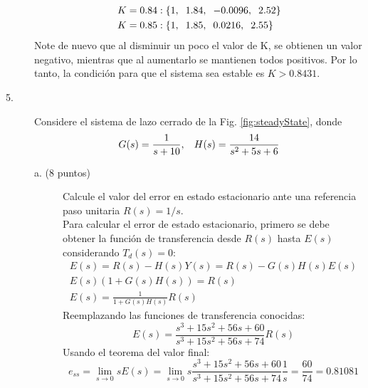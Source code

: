 \documentclass[11pt, spanish]{article}
\begin{document}
\begin{description}
			\begin{align*}
				K &= 0.84: \{1,\hspace*{2mm} 1.84,\hspace*{2mm} -0.0096,\hspace*{2mm} 2.52\}\\
				K &= 0.85: \{1,\hspace*{2mm} 1.85,\hspace*{2mm} 0.0216,\hspace*{2mm} 2.55\}
			\end{align*}
			Note de nuevo que al disminuir un poco el valor de K, se obtienen un valor negativo, mientras que al aumentarlo se mantienen todos positivos. Por lo tanto, la condición para que el sistema sea estable es $K > 0.8431$.


			\item [5.] Considere el sistema de lazo cerrado de la Fig. \ref{fig:steadyState}, donde
			\begin{equation*}
				G(s) = \frac{1}{s+10}, \hspace*{3mm} H(s) = \frac{14}{s^2+5s+6}
			\end{equation*}
			\begin{description}
				\item [a. (8 puntos)] Calcule el valor del error en estado estacionario ante una referencia paso unitaria $R(s) = 1/s$.\\
				Para calcular el error de estado estacionario, primero se debe obtener la función de transferencia desde $R(s)$ hasta $E(s)$ considerando $T_d(s)=0$:
				\begin{align*}
					E(s) = R(s) - H(s)Y(s) = R(s) - G(s)H(s)E(s)\\
					E(s)\left( 1 + G(s)H(s) \right) = R(s)\\
					E(s) = \frac{1}{1+G(s)H(s)}R(s)
				\end{align*}
				Reemplazando las funciones de transferencia conocidas:
				\begin{equation*}
					E(s) = \frac{s^3+15s^2+56s+60}{s^3+15s^2+56s+74}R(s)
				\end{equation*}
				Usando el teorema del valor final:
				\begin{equation*}
					e_{ss} = \lim_{s \rightarrow 0}sE(s) = \lim_{s \rightarrow 0} s \frac{s^3+15s^2+56s+60}{s^3+15s^2+56s+74}\frac{1}{s} = \frac{60}{74} = 0.81081
				\end{equation*}


\end{description}
\end{description}
\end{document}

